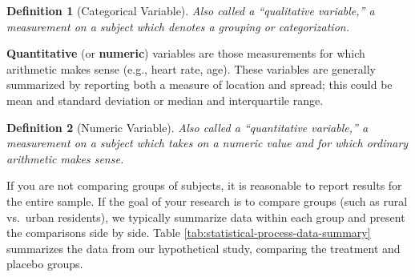 \documentclass[
]{book}
\theoremstyle{plain}
\theoremstyle{mydefn}
\newtheorem{definition}{Definition}[chapter]
\theoremstyle{myexmpl}
\theoremstyle{remark}
\begin{document}
\begin{definition}[Categorical Variable]
\protect\hypertarget{def:defn-categorical}{}{\label{def:defn-categorical} {} }Also called a ``qualitative variable,'' a measurement on a subject which denotes a grouping or categorization.
\end{definition}

\textbf{Quantitative} (or \textbf{numeric}) variables are those measurements for which arithmetic makes sense (e.g., heart rate, age). These variables are generally summarized by reporting both a measure of location and spread; this could be mean and standard deviation or median and interquartile range.

\begin{definition}[Numeric Variable]
\protect\hypertarget{def:defn-numeric}{}{\label{def:defn-numeric} {} }Also called a ``quantitative variable,'' a measurement on a subject which takes on a numeric value \emph{and} for which ordinary arithmetic makes sense.
\end{definition}

If you are not comparing groups of subjects, it is reasonable to report results for the entire sample. If the goal of your research is to compare groups (such as rural vs.~urban residents), we typically summarize data within each group and present the comparisons side by side. Table \ref{tab:statistical-process-data-summary} summarizes the data from our hypothetical study, comparing the treatment and placebo groups.

\begin{table}

\caption{\label{tab:statistical-process-data-summary}Summary of subjects from our hypothetical study. Qualitative variables are summarized as N (pct) and quantitative variables are summarized as mean (standard deviation).}
\centering
{}
\end{table}
\end{document}
